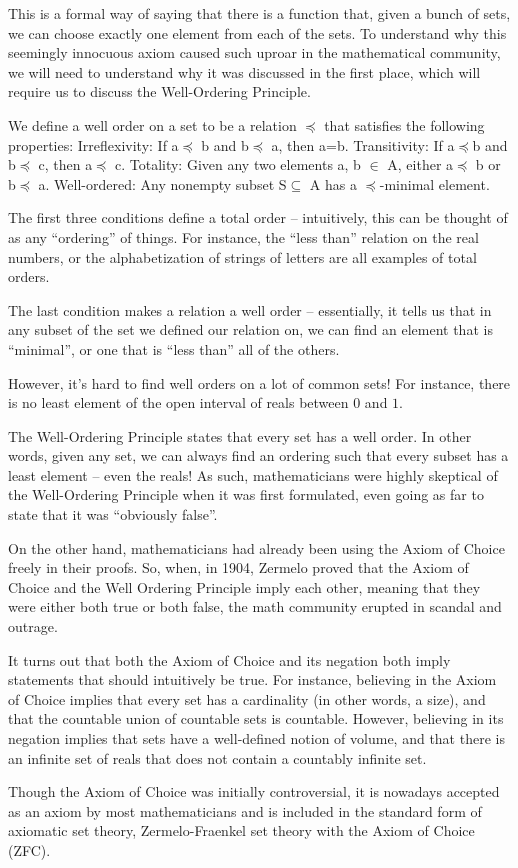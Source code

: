 \documentclass{article}
\begin{document}
This is a formal way of saying that there is a function that, given a bunch of sets, we can choose exactly one element from each of the sets. To understand why this seemingly innocuous axiom caused such uproar in the mathematical community, we will need to understand why it was discussed in the first place, which will require us to discuss the Well-Ordering Principle. 

We define a well order on a set to be a relation $\preceq$ that satisfies the following properties:
Irreflexivity: If a$\preceq$ b and b$\preceq$ a, then a=b.
Transitivity: If a$\preceq$b and b$\preceq$ c, then a$\preceq$ c.
Totality: Given any two elements a, b $\in$ A, either a$\preceq$ b or b$\preceq$ a.
Well-ordered: Any nonempty subset S$\subseteq$ A has a $\preceq$-minimal element.

The first three conditions define a total order – intuitively, this can be thought of as any “ordering” of things. For instance, the “less than” relation on the real numbers, or the alphabetization of strings of letters are all examples of total orders. 

The last condition makes a relation a well order – essentially, it tells us that in any subset of the set we defined our relation on, we can find an element that is “minimal”, or one that is “less than” all of the others.

However, it’s hard to find well orders on a lot of common sets! For instance, there is no least element of the open interval of reals between $0$ and $1$. 

The Well-Ordering Principle states that every set has a well order. In other words, given any set, we can always find an ordering such that every subset has a least element – even the reals! As such, mathematicians were highly skeptical of the Well-Ordering Principle when it was first formulated, even going as far to state that it was “obviously false”.

On the other hand, mathematicians had already been using the Axiom of Choice freely in their proofs. So, when, in 1904, Zermelo proved that the Axiom of Choice and the Well Ordering Principle imply each other, meaning that they were either both true or both false, the math community erupted in scandal and outrage. 

It turns out that both the Axiom of Choice and its negation both imply statements that should intuitively be true. For instance, believing in the Axiom of Choice implies that every set has a cardinality (in other words, a size), and that the countable union of countable sets is countable. However, believing in its negation implies that sets have a well-defined notion of volume, and that there is an infinite set of reals that does not contain a countably infinite set. 

Though the Axiom of Choice was initially controversial, it is nowadays accepted as an axiom by most mathematicians and is included in the standard form of axiomatic set theory, Zermelo-Fraenkel set theory with the Axiom of Choice (ZFC).
\end{document}
